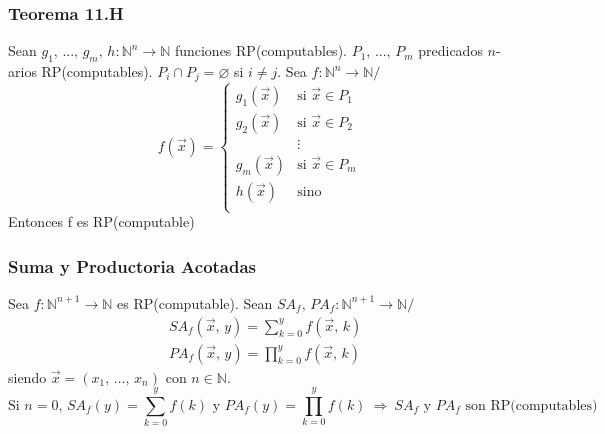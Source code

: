 \documentclass{article}
\newcommand{\comma}{,\,}                                %
\newcommand{\tq}{/\,}                                   %
\newcommand{\naturales}{\mathbb{N}}                     %
\newcommand{\Rightarrows}{\: \Rightarrow \:}            %
\newcommand{\sumatoria}[2]{\sum_{#1} ^{#2}}
\begin{document}
\subsubsection{Teorema 11.H}
Sean $g_1 \comma ... \comma g_m \comma h: \naturales^n \rightarrow \naturales$ funciones RP(computables). $P_1 \comma ... \comma P_m$ predicados $n$-arios RP(computables). $P_i \cap P_j = \varnothing$ si $i \neq j$. Sea $f: \naturales^n \rightarrow \naturales \tq$
\begin{equation*}
    f(\Vec{x}) = \begin{cases}
    g_1(\Vec{x}) &\text{si } \Vec{x} \in P_1 \\
    g_2(\Vec{x}) &\text{si } \Vec{x}  \in P_2 \\
    &\vdots \\
    g_m(\Vec{x}) &\text{si } \Vec{x}  \in P_m \\
    h(\Vec{x}) &\text{sino} \\
    \end{cases}
\end{equation*}
Entonces f es RP(computable)

\subsubsection{Suma y Productoria Acotadas}
Sea $f:\naturales^{n+1} \rightarrow \naturales$ es RP(computable). Sean $SA_f \comma PA_f: \naturales^{n+1} \rightarrow \naturales \tq$
\begin{align*}
    &SA_f(\Vec{x} \comma y) = \sumatoria{k=0}{y} f(\Vec{x} \comma k)\\
    &PA_f(\Vec{x} \comma y) = \prod_{k=0}^y f(\Vec{x} \comma k)
\end{align*}
siendo $\Vec{x} = (x_1 \comma ... \comma x_n)$ con $n \in \naturales$.
\begin{equation*}
    \text{Si $n=0$, $SA_f(y) = \sumatoria{k=0}{y} f(k)$ y $PA_f(y) = \prod_{k=0}^{y} f(k) \Rightarrows SA_f$ y $PA_f$ son RP(computables)}
\end{equation*}
\end{document}
